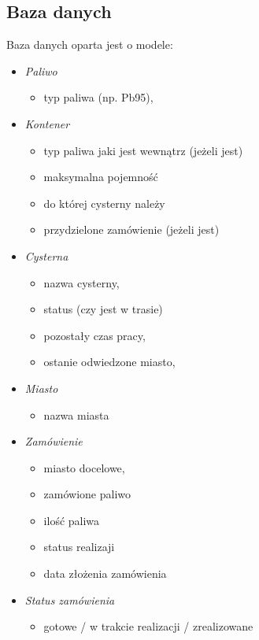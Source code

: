 \documentclass[11pt,a4paper,oneside]{mwart}
\begin{document}
\subsection{Baza danych}
Baza danych oparta jest o modele:
\begin{itemize}
  \item \emph{Paliwo} 
    \begin{itemize}
      \item typ paliwa (np. Pb95),
    \end{itemize}
    \item \emph{Kontener}  
          \begin{itemize}
            \item typ paliwa jaki jest wewnątrz (jeżeli jest)
            \item maksymalna pojemność
            \item do której cysterny należy
            \item przydzielone zamówienie (jeżeli jest)
    \end{itemize}
      \item \emph{Cysterna}  
            \begin{itemize}
      \item nazwa cysterny,
      \item status (czy jest w trasie)
      \item pozostały czas pracy,
      \item ostanie odwiedzone miasto,
    \end{itemize}
    \item \emph{Miasto} 
          \begin{itemize}
      \item nazwa miasta
    \end{itemize}
    \item \emph{Zamówienie}  
    \begin{itemize}
      \item miasto docelowe,
      \item zamówione paliwo
      \item ilość paliwa
      \item status realizaji
      \item data złożenia zamówienia
    \end{itemize}
    \item \emph{Status zamówienia}  
    \begin{itemize}
      \item gotowe / w trakcie realizacji / zrealizowane

\end{itemize}
\end{itemize}
\end{document}
